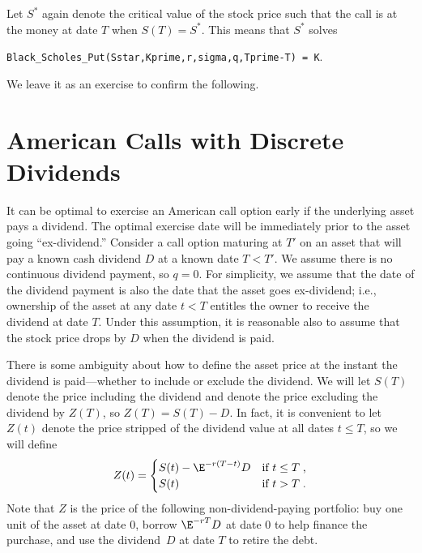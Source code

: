 Let $S^*$ again denote the critical value of the stock price such that the call is at the money at date $T$ when $S(T)=S^*$.  This means that $S^*$ solves
\begin{center}
\verb!Black_Scholes_Put(Sstar,Kprime,r,sigma,q,Tprime-T) = K!.
\end{center} 
We leave it as an exercise to confirm the following.


\section{American Calls with Discrete Dividends}\label{s_discrete}

It can be optimal to exercise an American call option early if the underlying asset pays a dividend.  The optimal exercise date will be immediately prior to the asset going ``ex-dividend.''  Consider a call option maturing at $T'$ on an asset that will pay a known cash dividend $D$ at a known date $T<T'$.  We assume there is no continuous dividend payment, so $q=0$.  For simplicity, we assume that the date of the dividend payment is also the date that the asset goes ex-dividend; i.e., ownership of the asset at any date $t<T$ entitles the owner to receive the dividend at date $T$.  Under this assumption, it is reasonable also to assume that the stock price drops by $D$ when the dividend is paid.  

There is some ambiguity about how to define the asset price at the instant the dividend is paid---whether to include or exclude the dividend.  We will let $S(T)$ denote the price including the dividend and denote the price excluding the dividend by $Z(T)$, so $Z(T) = S(T)-D$.   In fact, it is convenient to let $Z(t)$ denote the price stripped of the dividend value at all dates $t \leq T$, so we will define 
$$
Z(t) = \begin{cases}S(t)-\E^{-r(T-t)}D & \text{if $t \leq T$\;,}\\
S(t) & \text{if $t > T$\;.}
\end{cases}$$
Note that $Z$ is the price of the following non-dividend-paying portfolio: buy one unit of the asset at date 0, borrow $\E^{-rT}D$ at date 0 to help finance the purchase, and use the dividend~$D$ at date $T$ to retire the debt.

